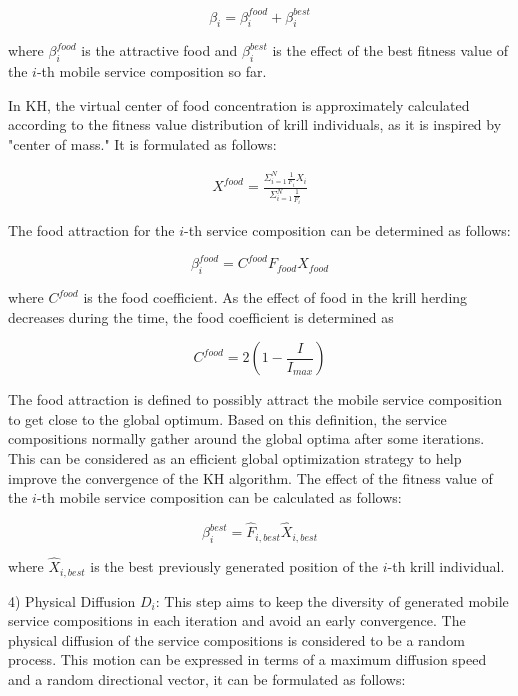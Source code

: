 \begin{equation}
\beta_i = \beta_i^{food}+\beta_i^{best}
\end{equation}

where $\beta^{food}_i$ is the attractive food and $\beta^{best}_i$ is the effect of the best fitness value of the $i$-th mobile service composition so far. 

In KH, the virtual center of food concentration is approximately calculated according to the fitness value distribution of krill individuals, as it is inspired by "center of mass." It is formulated as follows:

\begin{eqnarray}
X^{food} = \frac{\Sigma_{i=1}^N \frac{1}{F_i}X_i}{\Sigma_{i=1}^{N}\frac{1}{F_i}}
\end{eqnarray}

The food attraction for the $i$-th service composition can be determined as follows:

\begin{equation}
\beta^{food}_{i} = C^{food}F_{food}X_{food}
\end{equation}

where $C^{food}$ is the food coefficient. As the effect of food in the krill herding decreases during the time, the food coefficient is determined as

\begin{equation}
C^{food} = 2(1-\frac{I}{I_{max}})
\end{equation}

The food attraction is defined to possibly attract the mobile service composition to get close to the global optimum. Based on this definition, the service compositions normally gather around the global optima after some iterations. This can be considered as an efficient global optimization strategy to help improve the convergence of the KH algorithm. The effect of the fitness value of the $i$-th mobile service composition can be calculated as follows:

\begin{equation}
\beta_i^{best} = \hat{F}_{i,best}\hat{X}_{i,best}
\end{equation}

where $\hat{X}_{i,best}$ is the best previously generated position of the $i$-th krill individual.

4) Physical Diffusion $D_i$: This step aims to keep the diversity of generated mobile service compositions in each iteration and avoid an early convergence. The physical diffusion of the service compositions is considered to be a random process. This motion can be expressed in terms of a maximum diffusion speed and a random directional vector, it can be formulated as follows:

